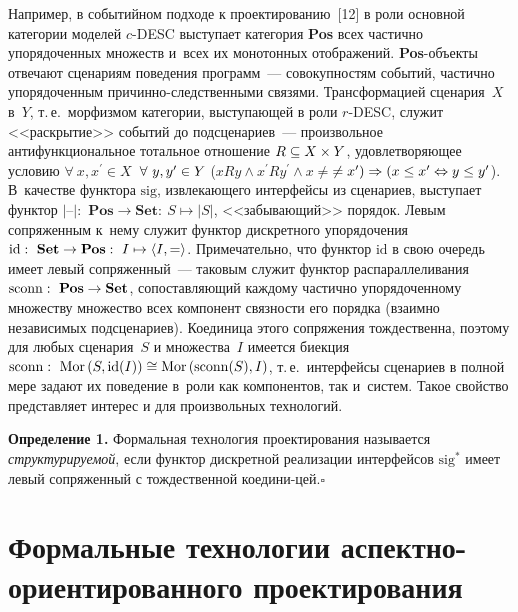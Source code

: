 \begin{multicols}{2}
 Например, в событийном подходе к проектированию~[12] в роли основной
категории моделей $c$-DESC выступает категория \textbf{Pos} всех частично
упорядоченных множеств и~всех их монотонных отображений.
 \textbf{Pos}-объекты отвечают сценариям поведения программ~---
совокупностям событий, частично упорядоченным
 при\-чин\-но-след\-ст\-вен\-ны\-ми связями. Трансформацией сценария~$X$
в~$Y$, т.\,е.\ морфизмом категории, выступающей в роли $r$-DESC, служит
<<раскрытие>> событий до подсценариев~--- произвольное
антифункциональное тотальное отношение $R\hm\subseteq X \times Y$,
удовлетворяющее условию $\forall\ x, x^\prime \in X$\ $\forall\ y, y^\prime \hm\in
Y$ ($xRy \wedge x^\prime Ry^\prime \wedge x \not=$\linebreak $\not= x^\prime) \Rightarrow (x \leq
x^\prime \hm\Leftrightarrow y \hm\leq y^\prime$). В~качестве функтора $\mathrm{sig}$,
извлекающего интерфейсы из сценариев, выступает функтор $\vert\mbox{--}\vert$:\
$\mathbf{Pos}\to \mathbf{Set}:\ S \mapsto \vert S\vert$, <<забывающий>>
порядок. Левым сопряженным к~нему служит функтор дискретного
упорядочения $\mathrm{id}:\ \mathbf{Set}\hm\to \mathbf{Pos}:\ I \mapsto \langle I,
=\rangle$. Примечательно, что функтор $\mathrm{id}$ в свою очередь имеет левый
сопряженный~--- таковым служит функтор распараллеливания $\mathrm{sconn}:\
\mathbf{Pos}\hm\to \mathbf{Set}$, сопостав\-ля\-ющий каждому частично
упорядоченному множеству множество всех компонент связности его порядка
(взаимно независимых подсценариев). Коединица этого сопряжения
тождественна, поэтому для любых сценария~$S$ и множества~$I$ имеется
биекция $\mathrm{sconn}:\ \mathrm{Mor}\,(S, \mathrm{id}(I)) \hm\cong \mathrm{Mor}\,(\mathrm{sconn}(S), I)$,
т.\,е.\ интерфейсы сценариев в полной мере задают их поведение в~роли как
компонентов, так и~сис\-тем. Такое свойство представляет интерес и для
произвольных технологий.

 \smallskip

 \noindent
 \textbf{Определение 1.} Формальная технология проектирования называется
\textit{структурируемой}, если функтор дискретной реализации интерфейсов
$\mathrm{sig}^*$ имеет\linebreak
 левый сопряженный с тождественной ко\-еди\-ни-\linebreak цей.\hfill$\square$

\section{Формальные технологии аспектно-ориентированного
проектирования}


\end{multicols}
